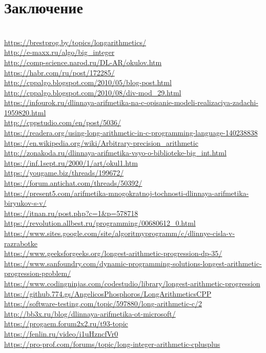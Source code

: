 \documentclass[a4paper]{article}
\begin{document}
\section{Заключение}

\newpage



\begin{flushleft}
\\
\url{https://brestprog.by/topics/longarithmetics/}\\
\url{http://e-maxx.ru/algo/big_integer}\\
\url{http://comp-science.narod.ru/DL-AR/okulov.htm}\\
\url{https://habr.com/ru/post/172285/}\\
\url{http://cppalgo.blogspot.com/2010/05/blog-post.html}\\
\url{http://cppalgo.blogspot.com/2010/08/div-mod_29.html}\\
\url{https://infourok.ru/dlinnaya-arifmetika-na-c-opisanie-modeli-realizaciya-zadachi-1959820.html}\\
\url{http://cppstudio.com/en/post/5036/}\\
\url{https://readera.org/using-long-arithmetic-in-c-programming-language-140238838}\\
\url{https://en.wikipedia.org/wiki/Arbitrary-precision_arithmetic}\\
\url{http://zonakoda.ru/dlinnaya-arifmetika-vsyo-o-biblioteke-big_int.html}\\
\url{https://inf.1sept.ru/2000/1/art/okul1.htm}\\
\url{https://yougame.biz/threads/199672/}\\
\url{https://forum.antichat.com/threads/50392/}\\
\url{https://present5.com/arifmetika-mnogokratnoj-tochnosti-dlinnaya-arifmetika-biryukov-s-v/}\\
\url{https://itnan.ru/post.php?c=1&p=578718}\\
\url{https://revolution.allbest.ru/programming/00680612_0.html}\\
\url{https://www.sites.google.com/site/algoritmyprogramm/c/dlinnye-cisla-v-razrabotke}\\
\url{https://www.geeksforgeeks.org/longest-arithmetic-progression-dp-35/}\\
\url{https://www.sanfoundry.com/dynamic-programming-solutions-longest-arithmetic-progression-problem/}\\
\url{https://www.codingninjas.com/codestudio/library/longest-arithmetic-progression}\\
\url{https://github.774.gs/AngelicosPhosphoros/LongArithmeticsCPP}\\
\url{https://software-testing.com/topic/597880/long-arithmetic-c/2}\\
\url{http://bb3x.ru/blog/dlinnaya-arifmetika-ot-microsoft/}\\
\url{https://progaem.forum2x2.ru/t93-topic}\\
\url{https://fenlin.ru/video/i1uHzncfVr0}\\
\url{https://pro-prof.com/forums/topic/long-integer-arithmetic-cplusplus}\\
\end{flushleft}
\end{document}

